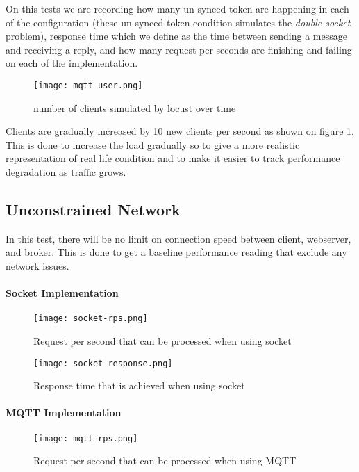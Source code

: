 On this tests we are recording how many un-synced token are happening in each of the configuration (these un-synced token condition simulates the \textit{double socket} problem), response time which we define as the time between sending a message and receiving a reply, and how many request per seconds are finishing and failing on each of the implementation.

\begin{figure}[h]
\centering
\texttt{[image: mqtt-user.png]}
\caption{number of clients simulated by locust over time}\label{fig:socket-user}
\end{figure}

Clients are gradually increased by 10 new clients per second as shown on figure \ref{fig:socket-user}. This is done to increase the load gradually so to give a more realistic representation of real life condition and to make it easier to track performance degradation as traffic grows.

\subsection{Unconstrained Network}

In this test, there will be no limit on connection speed between client, webserver, and broker. This is done to get a baseline performance reading that  exclude any network issues.

\paragraph{Socket Implementation}

\begin{figure}[h]
\centering
\texttt{[image: socket-rps.png]}
\caption{Request per second that can be processed when using socket}\label{fig:socket-rps}
\end{figure}

\begin{figure}[h]
\centering
\texttt{[image: socket-response.png]}
\caption{Response time that is achieved when using socket}\label{fig:socket-response}
\end{figure}

\paragraph{MQTT Implementation}

\begin{figure}[h]
\centering
\texttt{[image: mqtt-rps.png]}
\caption{Request per second that can be processed when using MQTT}\label{fig:mqtt-rps}
\end{figure}

